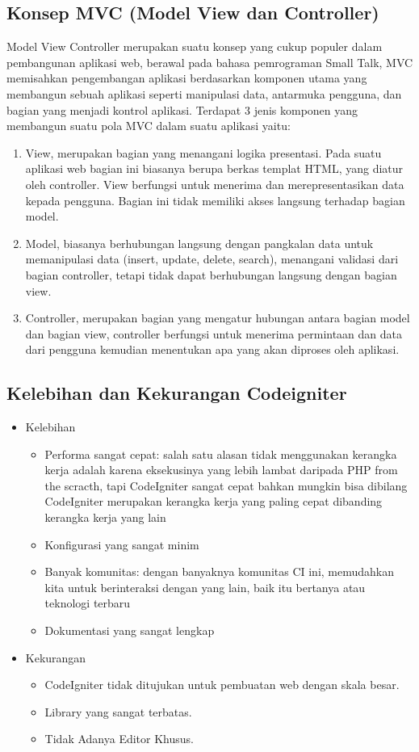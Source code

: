 \begin{enumerate}
\subsection{Konsep MVC (Model View dan Controller)}
Model View Controller merupakan suatu konsep yang cukup populer dalam pembangunan aplikasi web, berawal pada bahasa pemrograman Small Talk, MVC memisahkan pengembangan aplikasi berdasarkan komponen utama yang membangun sebuah aplikasi seperti manipulasi data, antarmuka pengguna, dan bagian yang menjadi kontrol aplikasi. Terdapat 3 jenis komponen yang membangun suatu pola MVC dalam suatu aplikasi yaitu: 
\begin{enumerate}
	\item View, merupakan bagian yang menangani logika presentasi. Pada suatu aplikasi web bagian ini biasanya berupa berkas templat HTML, yang diatur oleh controller. View berfungsi untuk menerima dan merepresentasikan data kepada pengguna. Bagian ini tidak memiliki akses langsung terhadap bagian model.
	\item Model, biasanya berhubungan langsung dengan pangkalan data untuk memanipulasi data (insert, update, delete, search), menangani validasi dari bagian controller, tetapi tidak dapat berhubungan langsung dengan bagian view.
	\item Controller, merupakan bagian yang mengatur hubungan antara bagian model dan bagian view, controller berfungsi untuk menerima permintaan dan data dari pengguna kemudian menentukan apa yang akan diproses oleh aplikasi.
\end{enumerate}

\subsection{Kelebihan dan Kekurangan Codeigniter}
\begin{itemize}
	\item Kelebihan
\begin{itemize}
	\item Performa sangat cepat: salah satu alasan tidak menggunakan kerangka kerja adalah karena eksekusinya yang lebih lambat daripada PHP from the scracth, tapi CodeIgniter sangat cepat bahkan mungkin bisa dibilang CodeIgniter merupakan kerangka kerja yang paling cepat dibanding kerangka kerja yang lain
	\item Konfigurasi yang sangat minim
	\item Banyak komunitas: dengan banyaknya komunitas CI ini, memudahkan kita untuk berinteraksi dengan yang lain, baik itu bertanya atau teknologi terbaru
	\item Dokumentasi yang sangat lengkap
\end{itemize}
	\item Kekurangan
\begin{itemize}
	\item CodeIgniter tidak ditujukan untuk pembuatan web dengan skala besar.
	\item Library yang sangat terbatas.
	\item Tidak Adanya Editor Khusus.
\end{itemize}
\end{itemize}

\end{enumerate}
